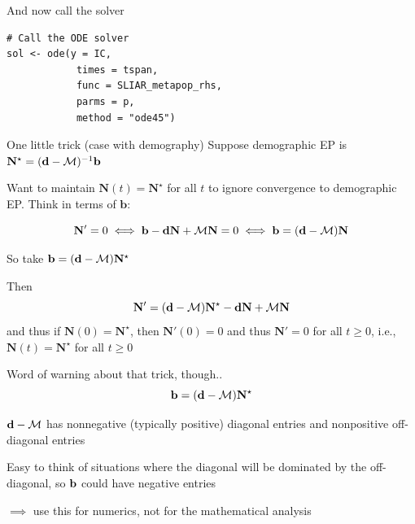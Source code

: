 \documentclass[aspectratio=43]{beamer}
\begin{document}
\begin{frame}[fragile]{And now call the solver}
\begin{lstlisting}
# Call the ODE solver
sol <- ode(y = IC, 
			times = tspan, 
			func = SLIAR_metapop_rhs, 
			parms = p,
			method = "ode45")
\end{lstlisting}	
\end{frame}
	
\begin{frame}[fragile]{One little trick (case with demography)}
	Suppose demographic EP is $\mathbf{N}^\star=(\mathbf{d}-\mathcal{M})^{-1}\mathbf{b}$

	Want to maintain $\mathbf{N}(t)=\mathbf{N}^\star$ for all $t$ to ignore convergence to demographic EP. Think in terms of $\mathbf{b}$:
	
	$$
	\mathbf{N}'=0\iff \mathbf{b}-\mathbf{d}\mathbf{N}+\mathcal{M}\mathbf{N}=0 \iff \mathbf{b} = (\mathbf{d}-\mathcal{M})\mathbf{N}
	$$
	
	So take $\mathbf{b}=(\mathbf{d}-\mathcal{M})\mathbf{N}^\star$
	
	Then
	$$
	\mathbf{N}' = (\mathbf{d}-\mathcal{M})\mathbf{N}^\star
	-\mathbf{d}\mathbf{N}+\mathcal{M}\mathbf{N}
	$$
	and thus if $\mathbf{N}(0)=\mathbf{N}^\star$, then $\mathbf{N}'(0)=0$ and thus $\mathbf{N}'=0$ for all $t\geq 0$, i.e., $\mathbf{N}(t)=\mathbf{N}^\star$ for all $t\geq 0$
\end{frame}

\begin{frame}{Word of warning about that trick, though..}
$$
\mathbf{b}=(\mathbf{d}-\mathcal{M})\mathbf{N}^\star
$$
	
$\mathbf{d}-\mathcal{M}$ has nonnegative (typically positive) diagonal entries and nonpositive off-diagonal entries
	
Easy to think of situations where the diagonal will be dominated by the off-diagonal, so $\mathbf{b}$ could have negative entries
	
$\implies$ use this for numerics, not for the mathematical analysis
\end{frame}
\end{document}
